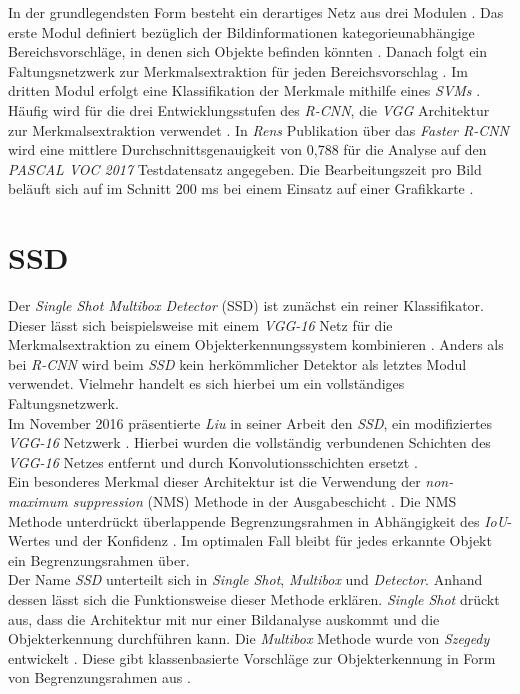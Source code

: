 		In der grundlegendsten Form besteht ein derartiges Netz aus drei Modulen \cite{rcnn}. Das erste Modul definiert bezüglich der Bildinformationen kategorieunabhängige Bereichsvorschläge, in denen sich Objekte befinden könnten \cite{rcnn}. Danach folgt ein Faltungsnetzwerk zur Merkmalsextraktion für jeden Bereichsvorschlag \cite{rcnn}. Im dritten Modul erfolgt eine Klassifikation der Merkmale mithilfe eines \textit{SVMs} \cite{rcnn}. Häufig wird für die drei Entwicklungsstufen des \textit{R-CNN}, die \textit{VGG} Architektur zur Merkmalsextraktion verwendet \cite{fastrcnn}. In \textit{Rens} Publikation über das \textit{Faster R-CNN} wird eine mittlere Durchschnittsgenauigkeit von 0,788 für die Analyse auf den \textit{PASCAL VOC 2017} Testdatensatz angegeben. Die Bearbeitungszeit pro Bild beläuft sich auf im Schnitt 200 ms bei einem Einsatz auf einer Grafikkarte \cite{fasterrcnn}.
		
		\section*{SSD}
		
		Der \textit{Single Shot Multibox Detector} (SSD) ist zunächst ein reiner Klassifikator. Dieser lässt sich beispielsweise mit einem \textit{VGG-16} Netz für die Merkmalsextraktion zu einem Objekterkennungssystem kombinieren \cite{ssd}. Anders als bei \textit{R-CNN} wird beim \textit{SSD} kein herkömmlicher Detektor als letztes Modul verwendet. Vielmehr handelt es sich hierbei um ein vollständiges Faltungsnetzwerk.\\
		
		Im November 2016 präsentierte \textit{Liu} in seiner Arbeit den \textit{SSD}, ein modifiziertes \textit{VGG-16} Netzwerk \cite{ssd}. Hierbei wurden die vollständig verbundenen Schichten des \textit{VGG-16} Netzes entfernt und durch Konvolutionsschichten ersetzt \cite{ssd}.\\
		
		Ein besonderes Merkmal dieser Architektur ist die Verwendung der \textit{non-maximum suppression} (NMS) Methode in der Ausgabeschicht \cite{ssd}. Die NMS Methode unterdrückt überlappende Begrenzungsrahmen in Abhängigkeit des \textit{IoU}-Wertes und der Konfidenz \cite{nms}. Im optimalen Fall bleibt für jedes erkannte Objekt ein Begrenzungsrahmen über.\\
		
		Der Name \textit{SSD} unterteilt sich in \textit{Single Shot}, \textit{Multibox} und \textit{Detector}. Anhand dessen lässt sich die Funktionsweise dieser Methode erklären. \textit{Single Shot} drückt aus, dass die Architektur mit nur einer Bildanalyse auskommt und die Objekterkennung durchführen kann. Die \textit{Multibox} Methode wurde von \textit{Szegedy} entwickelt \cite{multibox}. Diese gibt klassenbasierte Vorschläge zur Objekterkennung in Form von Begrenzungsrahmen aus \cite{multibox}.\\
		
